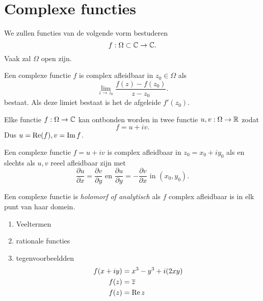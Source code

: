 \section{Complexe functies} \label{sec:complexe_functies}
We zullen functies van de volgende vorm bestuderen
\[
f: \Omega \subset  \mathbb{C} \to \mathbb{C}
.\] 
Vaak zal $\Omega$ open zijn.
\begin{definitie}
Een complexe functie $f$ is complex afleidbaar in $z_0 \in \Omega$ als \[
	\lim_{z \to z_0} \frac{f(z) - f(z_0)}{z - z_0}
.\] 
bestaat. Als deze limiet bestaat is het de afgeleide $f'(z_0)$. 
\end{definitie}
Elke functie $f: \Omega \to \mathbb{C}$ kan ontbonden worden in twee functie $u,v: \Omega \to \mathbb{R}$ zodat \[
	f = u + iv
.\] 
Dus $u = \operatorname{Re} (f), v = \operatorname{Im} f$.
 \begin{stelling}
	 Een complexe functie $f = u + iv$ is complex afleidbaar in $z_0 = x_0 + iy_0$ als en slechts als $u, v$ reeel afleidbaar zijn met  \[
		 \frac{\partial u}{\partial x} = \frac{\partial v}{\partial y} \text{ en } \frac{\partial u}{\partial y} = - \frac{\partial v}{\partial x} \text{ in } (x_0,y_0)
	 .\] 
\end{stelling}
\begin{definitie}
	Een complexe functie is \emph{holomorf of analytisch} als $f$ complex afleidbaar is in elk punt van haar domein.
\end{definitie}
\begin{vb}
	\begin{enumerate}
		\item Veeltermen  
		\item rationale functies
		\item tegenvoorbeeldden \begin{align*}
				f(x + iy) &= x^3 - y^3 + i(2xy)\\
				f(z) &= \overline{z}\\
				f(z) &=  \operatorname{Re} z 
			\end{align*} 
		
	\end{enumerate}
\end{vb}
